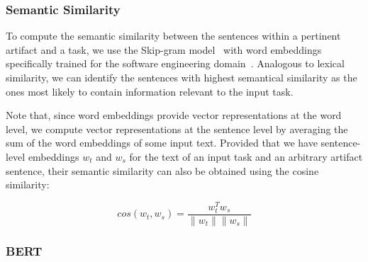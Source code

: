 \subsubsection{Semantic Similarity}






To compute the semantic similarity between the sentences within a pertinent artifact and a task,
we use the Skip-gram model~\cite{Mikolov2013} with word embeddings specifically trained for the software engineering domain~\cite{Efstathiou2018}.
Analogous to lexical similarity,  we can identify the sentences with highest semantical similarity 
as the ones most likely to contain information relevant to the input task.



Note that, since word embeddings provide vector representations at the word level, we compute vector representations 
at the sentence level by averaging the sum of the word embeddings of some input text.
Provided that we have sentence-level embeddings $w_t$ and $w_s$ for the text 
of an input task and an arbitrary artifact sentence, 
their semantic similarity can also be obtained 
using the cosine similarity: 



\begin{equation}
    cos(w_t,w_s) = \frac{w_t^Tw_s}{\|w_t\| \|w_s\|}
    \label{eq:word-sim}
\end{equation}




\subsubsection{BERT}














